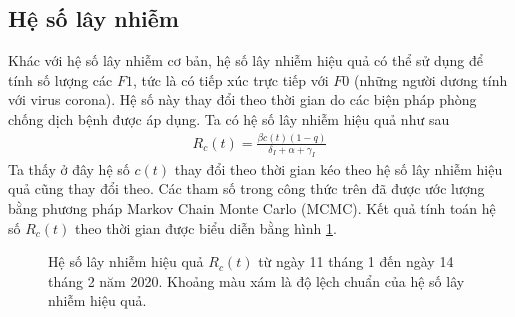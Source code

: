 \documentclass[../main.tex]{subfiles}
\begin{document}
\subsection{Hệ số lây nhiễm}
Khác với hệ số lây nhiễm cơ bản, hệ số lây nhiễm hiệu quả có thể sử dụng để tính số lượng các $F1$, tức là có tiếp xúc trực tiếp với $F0$ (những người dương tính với virus corona). Hệ số này thay đổi theo thời gian do các biện pháp phòng chống dịch bệnh được áp dụng. Ta có hệ số lây nhiễm hiệu quả như sau
\begin{align*}
    R_c(t)=\frac{\beta c(t) (1-q)}{\delta_I + \alpha +\gamma_I}
\end{align*}
Ta thấy ở đây hệ số $c(t)$ thay đổi theo thời gian kéo theo hệ số lây nhiễm hiệu quả cũng thay đổi theo. Các tham số trong công thức trên đã được ước lượng bằng phương pháp Markov Chain Monte Carlo (MCMC). Kết quả tính toán hệ số $R_c(t)$ theo thời gian được biểu diễn bằng hình \ref{fig:4}.

\begin{figure}[H]
    \centering
    \caption{Hệ số lây nhiễm hiệu quả $R_c(t)$ từ ngày 11 tháng 1 đến ngày 14 tháng 2 năm 2020. Khoảng màu xám là độ lệch chuẩn của hệ số lây nhiễm hiệu quả.}
    \label{fig:4}
\end{figure}
\end{document}
